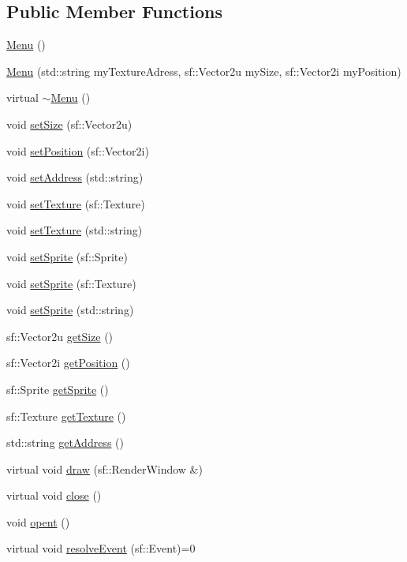 \subsection*{Public Member Functions}
\begin{DoxyCompactItemize}
\item 
\hyperlink{class_menu_ad466dd83355124a6ed958430450bfe94}{Menu} ()
\item 
\hyperlink{class_menu_af64b0c25ff426ce6b7819b1f24f17bd5}{Menu} (std\+::string my\+Texture\+Adress, sf\+::\+Vector2u my\+Size, sf\+::\+Vector2i my\+Position)
\item 
virtual \hyperlink{class_menu_a831387f51358cfb88cd018e1777bc980}{$\sim$\+Menu} ()
\item 
void \hyperlink{class_menu_a73160bee6f7a67c04ffe63b58fc19c7c}{set\+Size} (sf\+::\+Vector2u)
\item 
void \hyperlink{class_menu_a41687c51ee454954ce7ec116cc1f7459}{set\+Position} (sf\+::\+Vector2i)
\item 
void \hyperlink{class_menu_aade766e02b73948ebafb712ca9e53e12}{set\+Address} (std\+::string)
\item 
void \hyperlink{class_menu_a7d77cca2bf67824ebfb17b304950f2fc}{set\+Texture} (sf\+::\+Texture)
\item 
void \hyperlink{class_menu_a87144c354eae67283f29676a1d5207b6}{set\+Texture} (std\+::string)
\item 
void \hyperlink{class_menu_ae4f85d7309f7516a6147a5e8a85d1f7a}{set\+Sprite} (sf\+::\+Sprite)
\item 
void \hyperlink{class_menu_a98f348210794d6dbb3a5c5287f330e89}{set\+Sprite} (sf\+::\+Texture)
\item 
void \hyperlink{class_menu_afc4c1ec46b7e91299e1a0bbad98ea65e}{set\+Sprite} (std\+::string)
\item 
sf\+::\+Vector2u \hyperlink{class_menu_a570493d92f586ea813ecf3c9ea064bb9}{get\+Size} ()
\item 
sf\+::\+Vector2i \hyperlink{class_menu_ada5303b1b8997b3d117b8a553764d10f}{get\+Position} ()
\item 
sf\+::\+Sprite \hyperlink{class_menu_a2df8bb3db21a96e665e12bcaa0b3d5ef}{get\+Sprite} ()
\item 
sf\+::\+Texture \hyperlink{class_menu_a02124c4cb527346ac42b5c48235bea7f}{get\+Texture} ()
\item 
std\+::string \hyperlink{class_menu_a8eef8d68a55d02a9c12d6f1a2d832edc}{get\+Address} ()
\item 
virtual void \hyperlink{class_menu_a5c486201ec217b10588c145d043e4eb8}{draw} (sf\+::\+Render\+Window \&)
\item 
virtual void \hyperlink{class_menu_a4bc958c66bb39a91446b5c12ac6469c6}{close} ()
\item 
void \hyperlink{class_menu_a21202f42edbb5f1014ebe9f264613991}{opent} ()
\item 
virtual void \hyperlink{class_menu_a91ec4d6d898e740524b1fe3312d8f197}{resolve\+Event} (sf\+::\+Event)=0
\end{DoxyCompactItemize}
